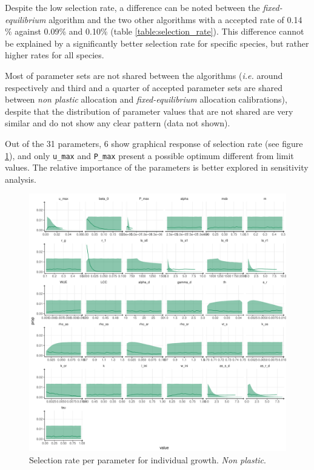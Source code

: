 
Despite the low selection rate, a difference can be noted between the \textit{fixed-equilibrium} algorithm and the two other algorithms with a accepted rate of 0.14 \% against 0.09\% and 0.10\% (table \ref{table:selection_rate}). This difference cannot be explained by a significantly better selection rate for specific species, but rather higher rates for all species.

Most of parameter sets are not shared between the algorithms (\textit{i.e.} around respectively and third and a quarter of accepted parameter sets are shared between \textit{non plastic} allocation and \textit{fixed-equilibrium} allocation calibrations), despite that the distribution of parameter values that are not shared are very similar and do not show any clear pattern (data not shown).

Out of the 31 parameters, 6 show graphical response of selection rate (see figure \ref{fig:accept_rate}), and only  \texttt{u\_max} and \texttt{P\_max} present a possible optimum different from limit values. The relative importance of the parameters is better explored in sensitivity analysis.







\begin{figure}\label{fig:accept_rate}
\includegraphics[width = \textwidth]{./2_PP/Figures/acceptance_rate_RSRnWeight_per_par.pdf}
\caption{Selection rate per parameter for individual growth. \textit{Non plastic}.}
\end{figure}


